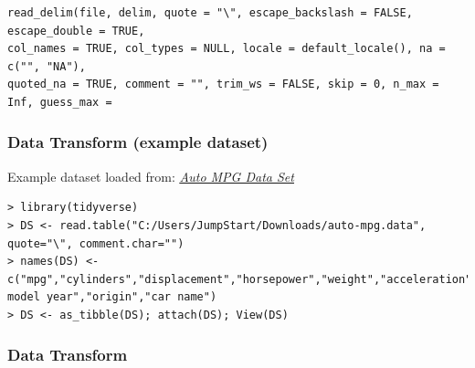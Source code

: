 \documentclass[a4paper]{article}
\begin{document}
			\begin{lstlisting}
read_delim(file, delim, quote = "\", escape_backslash = FALSE, escape_double = TRUE,
col_names = TRUE, col_types = NULL, locale = default_locale(), na = c("", "NA"),
quoted_na = TRUE, comment = "", trim_ws = FALSE, skip = 0, n_max = Inf, guess_max =
			\end{lstlisting}
			
			\subsubsection{Data Transform (example dataset)}
		
			Example dataset loaded from: \href{https://archive.ics.uci.edu/ml/machine-learning-databases/auto-mpg/}{\textit{\underline{Auto MPG Data Set}}}

			\begin{lstlisting}
> library(tidyverse)
> DS <- read.table("C:/Users/JumpStart/Downloads/auto-mpg.data",
quote="\", comment.char="")
> names(DS) <-
c("mpg","cylinders","displacement","horsepower","weight","acceleration","
model year","origin","car name")
> DS <- as_tibble(DS); attach(DS); View(DS)
			\end{lstlisting}
			
			\newpage
			
			\subsubsection{Data Transform}
		
\end{document}
